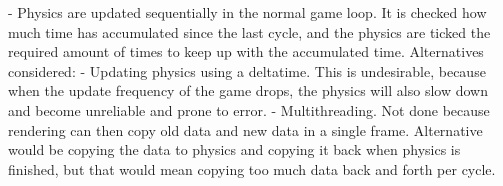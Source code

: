 - Physics are updated sequentially in the normal game loop. It is checked how much time has accumulated since the last cycle, and the physics are ticked the required amount of times to keep up with the accumulated time.
  Alternatives considered:
    - Updating physics using a deltatime. This is undesirable, because when the update frequency of the game drops, the physics will also slow down and become unreliable and prone to error.
    - Multithreading. Not done because rendering can then copy old data and new data in a single frame. Alternative would be copying the data to physics and copying it back when physics is finished, but that would mean copying too much data back and forth per cycle.